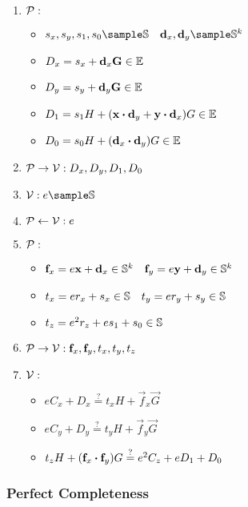 \begin{enumerate}
    \item $\mathcal{P}:$
        \begin{itemize}
            \item $s_x, s_y, s_1, s_0 \sample \scalars \quad \vec{d}_x, \vec{d}_y \sample \scalars^k$
            \item $D_x = s_x + \mathbf{d}_x\mathbf{G} \in \mathbb{E}$
            \item $D_y = s_y + \mathbf{d}_y\mathbf{G} \in \mathbb{E}$
            \item $D_1 = s_1H + (\mathbf{x} \boldsymbol{\cdot} \mathbf{d}_y + \mathbf{y} \boldsymbol{\cdot} \mathbf{d}_x)G \in \mathbb{E}$
            \item $D_0 = s_0H + (\mathbf{d}_x \boldsymbol{\cdot} \mathbf{d}_y)G \in \mathbb{E}$
        \end{itemize}
    \item $\mathcal{P} \to \mathcal{V}: D_x, D_y, D_1, D_0$
    \item \hfill $\verifier: e \sample \scalars$
    \item \hfill $\mathcal{P} \leftarrow \mathcal{V}: e$
    \item $\mathcal{P}:$
        \begin{itemize}
            \item $\mathbf{f}_x = e\mathbf{x} + \mathbf{d}_x \in \mathbb{S}^k \quad \mathbf{f}_y = e\mathbf{y} + \mathbf{d}_y \in \mathbb{S}^k$
            \item $t_x = er_x + s_x \in \mathbb{S} \quad t_y = er_y + s_y \in \mathbb{S}$
            \item $t_z = e^2r_z + es_1 + s_0 \in \mathbb{S}$
        \end{itemize}
    \item $\mathcal{P} \to \mathcal{V}: \mathbf{f}_x, \mathbf{f}_y, t_x, t_y, t_z$
    \item \hfill $\mathcal{V}:$
        \begin{itemize}
            \item \hfill $eC_x + D_x \overset{?}{=} t_xH + \vec{f}_x \vec{G}$
            \item \hfill $eC_y + D_y \overset{?}{=} t_yH + \vec{f}_y \vec{G}$
            \item \hfill $t_zH + (\mathbf{f}_x \boldsymbol{\cdot} \mathbf{f}_y)G \overset{?}{=} e^2C_z + eD_1 + D_0$
        \end{itemize}
\end{enumerate}

\subsubsection{Perfect Completeness}

